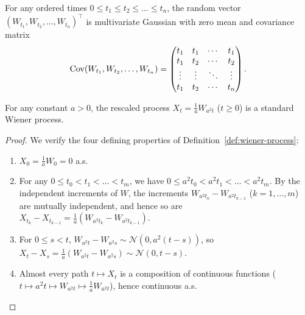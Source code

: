 \begin{note}
\label{note:wiener-cov-matrix}
For any ordered times $0 \le t_1 \le t_2 \le \dots \le t_n$, the random vector $(W_{t_1}, W_{t_2}, \dots, W_{t_n})^\top$ is multivariate Gaussian with zero mean and covariance matrix
\[
\operatorname{Cov}(W_{t_1}, W_{t_2}, \dots, W_{t_n}) =
\begin{pmatrix}
    t_1 & t_1 & \cdots & t_1 \\
    t_1 & t_2 & \cdots & t_2 \\
    \vdots & \vdots & \ddots & \vdots \\
    t_1 & t_2 & \cdots & t_n
\end{pmatrix}.
\]
\end{note}

\begin{theorem}
\label{thm:wiener-scaling}
For any constant $a > 0$, the rescaled process $X_t = \frac{1}{a} W_{a^2 t}$ ($t \ge 0$) is a standard Wiener process.
\end{theorem}
\begin{proof}
We verify the four defining properties of Definition~\ref{def:wiener-process}:
\begin{enumerate}
    \item $X_0 = \frac{1}{a} W_0 = 0$ a.s.
    \item For any $0 \le t_0 < t_1 < \dots < t_m$, we have $0 \le a^2 t_0 < a^2 t_1 < \dots < a^2 t_m$. By the independent increments of $W$, the increments $W_{a^2 t_k} - W_{a^2 t_{k-1}}$ ($k = 1, \dots, m$) are mutually independent, and hence so are $X_{t_k} - X_{t_{k-1}} = \frac{1}{a}(W_{a^2 t_k} - W_{a^2 t_{k-1}})$.
    \item For $0 \le s < t$, $W_{a^2 t} - W_{a^2 s} \sim \mathcal{N}(0, a^2(t-s))$, so $X_t - X_s = \frac{1}{a}(W_{a^2 t} - W_{a^2 s}) \sim \mathcal{N}(0, t-s)$.
    \item Almost every path $t \mapsto X_t$ is a composition of continuous functions ($t \mapsto a^2 t \mapsto W_{a^2 t} \mapsto \frac{1}{a} W_{a^2 t}$), hence continuous a.s. \qedhere
\end{enumerate}
\end{proof}

